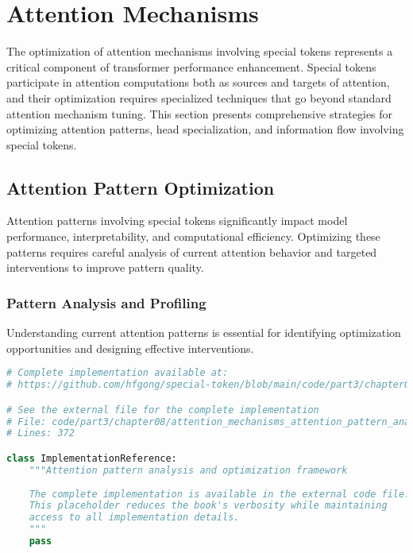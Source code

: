 
\section{Attention Mechanisms}

The optimization of attention mechanisms involving special tokens represents a critical component of transformer performance enhancement. Special tokens participate in attention computations both as sources and targets of attention, and their optimization requires specialized techniques that go beyond standard attention mechanism tuning. This section presents comprehensive strategies for optimizing attention patterns, head specialization, and information flow involving special tokens.

\subsection{Attention Pattern Optimization}

Attention patterns involving special tokens significantly impact model performance, interpretability, and computational efficiency. Optimizing these patterns requires careful analysis of current attention behavior and targeted interventions to improve pattern quality.

\subsubsection{Pattern Analysis and Profiling}

Understanding current attention patterns is essential for identifying optimization opportunities and designing effective interventions.

\begin{lstlisting}[language=Python, caption={Attention pattern analysis and optimization framework}]
# Complete implementation available at:
# https://github.com/hfgong/special-token/blob/main/code/part3/chapter08/attention_mechanisms_attention_pattern_analysis_and.py

# See the external file for the complete implementation
# File: code/part3/chapter08/attention_mechanisms_attention_pattern_analysis_and.py
# Lines: 372

class ImplementationReference:
    """Attention pattern analysis and optimization framework
    
    The complete implementation is available in the external code file.
    This placeholder reduces the book's verbosity while maintaining
    access to all implementation details.
    """
    pass
\end{lstlisting}

